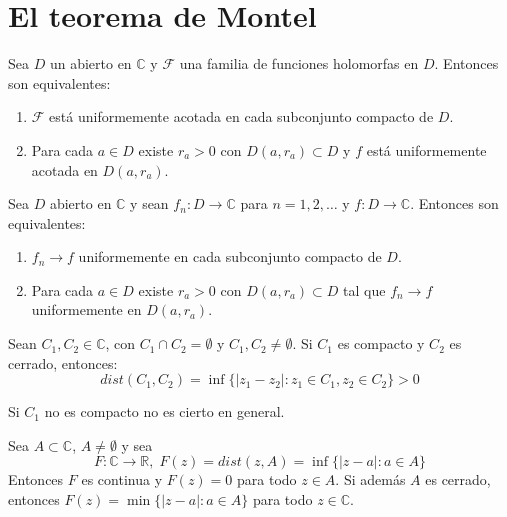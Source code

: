 \section{El teorema de Montel}
\begin{lemma}
    Sea $D$ un abierto en $\mathbb{C}$ y $\mathcal{F}$ una familia de funciones holomorfas en $D$.
    Entonces son equivalentes:
    \begin{enumerate}
        \item $\mathcal{F}$ está uniformemente acotada en cada subconjunto compacto de $D$.
        \item Para cada $a \in D$ existe $r_a > 0$ con $D(a, r_a) \subset D$ y $f$ está uniformemente acotada en $D(a, r_a)$.
    \end{enumerate}
\end{lemma}

\begin{lemma}
    Sea $D$ abierto en $\mathbb{C}$ y sean $f_n: D \to \mathbb{C}$ para $n = 1, 2, \dots$ y $f: D \to \mathbb{C}$.
    Entonces son equivalentes:
    \begin{enumerate}
        \item $f_n \to f$ uniformemente en cada subconjunto compacto de $D$.
        \item Para cada $a \in D$ existe $r_a > 0$ con $D(a, r_a) \subset D$ tal que $f_n \to f$ uniformemente en $D(a, r_a)$.
    \end{enumerate}
\end{lemma}

\begin{lemma}
    Sean $C_1, C_2 \in \mathbb{C}$, con $C_1 \cap C_2 = \emptyset$ y $C_1, C_2 \neq \emptyset$.
    Si $C_1$ es compacto y $C_2$ es cerrado, entonces:
    $$dist(C_1, C_2) = \inf\{|z_1-z_2| : z_1 \in C_1, z_2 \in C_2\} > 0$$
\end{lemma}

\begin{remark}
    Si $C_1$ no es compacto no es cierto en general.
\end{remark}

\begin{lemma}
    Sea $A \subset \mathbb{C}$, $A \neq \emptyset$ y sea
    $$F: \mathbb{C} \to \mathbb{R}, \; F(z) = dist(z, A) = \inf \{|z-a| : a \in A\}$$
    Entonces $F$ es continua y $F(z) = 0$ para todo $z \in A$.
    Si además $A$ es cerrado, entonces $F(z) = \min \{|z-a| : a \in A\}$ para todo $z \in \mathbb{C}$.
\end{lemma}

